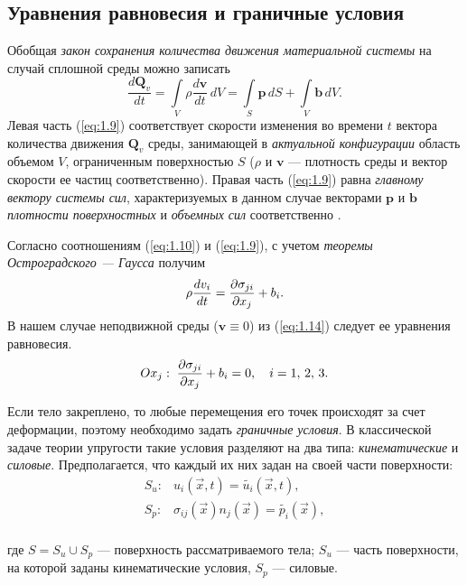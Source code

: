 \documentclass[12pt, a4paper]{article}
\begin{document}
	\subsection{Уравнения равновесия и граничные условия}
Обобщая \textit{закон сохранения количества движения материальной системы} на случай сплошной среды можно записать
\begin{equation}
	\frac{d\boldsymbol{Q}_v}{dt} = \int\limits_V \rho \frac{d\boldsymbol v}{dt}\,dV=\int\limits_S \boldsymbol p\,dS +\int\limits_V \boldsymbol b\,dV.
	\label{eq:1.9}
\end{equation}
Левая часть (\ref{eq:1.9}) соответствует скорости изменения во времени $t$ вектора количества движения $\boldsymbol{Q}_v$ среды, занимающей в \textit{актуальной конфигурации} область объемом $V$, ограниченным поверхностью $S$ ($\rho$ и $\boldsymbol v$ --- плотность среды и вектор скорости ее частиц соответственно). Правая часть (\ref{eq:1.9}) равна \textit{главному вектору системы сил}, характеризуемых в данном случае векторами $\boldsymbol p$ и $\boldsymbol b$ \textit{плотности поверхностных} и \textit{объемных сил} соответственно \cite{zarubin}.

Согласно соотношениям (\ref{eq:1.10}) и (\ref{eq:1.9}), с учетом \textit{теоремы Остроградского --- Гаусса} получим
\begin{equation}
	\rho \frac{dv_i}{dt} = \frac{\partial \sigma_{ji}}{\partial x_j}+b_i.
	\label{eq:1.14}
\end{equation}
В нашем случае неподвижной среды ($\boldsymbol v \equiv 0$) из (\ref{eq:1.14}) следует ее уравнения равновесия.
\begin{equation}
Ox_j:\;\frac{\partial \sigma_{ji}}{\partial x_j}+b_i = 0,\quad i = 1,\,2,\,3.
\end{equation}

Если тело закреплено, то любые перемещения его точек происходят за счет деформации, поэтому необходимо задать \textit{граничные условия}. В классической задаче теории упругости такие условия разделяют на два типа: \textit{кинематические} и \textit{силовые}. Предполагается, что каждый их них задан на своей части поверхности:
\[
\begin{split}
	S_u\colon& u_i(\vec x, t) = \widetilde{u_i}(\vec x, t), \\
	S_p\colon& \sigma_{ij}(\vec x) n_j(\vec x)  = \widetilde{p_i}(\vec x),  \\
\end{split}
\]

\noindent где $S = S_u \cup S_p$ --- поверхность рассматриваемого тела; $S_u$ --- часть поверхности, на которой заданы кинематические условия, $S_p$ --- силовые.
\end{document}
